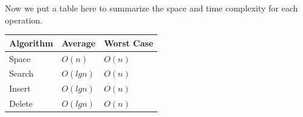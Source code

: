 \documentclass[data-structure.tex]{subfiles}
\begin{document}





     
 
   

Now  we put a table here to summarize the space and time complexity for each operation.
\begin{table}[h]
\begin{small}
\centering
\noindent{}
 \noindent \begin{tabular}{|p{}|p{}| p{}|}
  \hline
 Algorithm & Average & Worst Case  \\ \hline
Space  & $O(n)$& $O(n)$ \\
Search   & $O(lgn)$ & $O(n)$ \\ \hline

Insert & $O(lgn)$ & $O(n)$ \\ 
Delete & $O(lgn)$ & $O(n)$ \\ \hline
\end{tabular}
  \label{tab:msrc_precession}
  \end{small}
\end{table}
\end{document}

